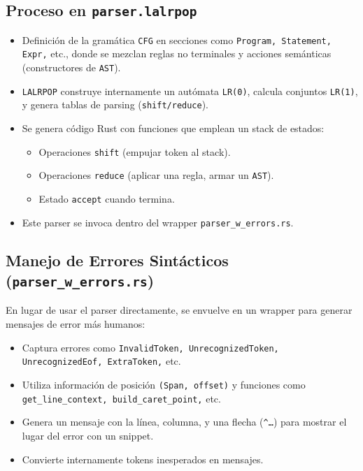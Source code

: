 \documentclass{article}
\begin{document}
\subsection{Proceso en \texttt{parser.lalrpop}}
\begin{itemize}
    \item Definición de la gramática \texttt{CFG} en secciones como \texttt{Program, Statement, Expr,} etc., donde se mezclan reglas no terminales y acciones semánticas (constructores de \texttt{AST}).
    \item \texttt{LALRPOP} construye internamente un autómata \texttt{LR(0)}, calcula conjuntos \texttt{LR(1)}, y genera tablas de parsing (\texttt{shift/reduce}).
    \item Se genera código Rust con funciones que emplean un stack de estados:
        \begin{itemize}
            \item Operaciones \texttt{shift} (empujar token al stack).
            \item Operaciones \texttt{reduce} (aplicar una regla, armar un \texttt{AST}).
            \item Estado \texttt{accept} cuando termina.
        \end{itemize}
    \item Este parser se invoca dentro del wrapper \texttt{parser\_w\_errors.rs}.
\end{itemize}

\subsection{Manejo de Errores Sintácticos (\texttt{parser\_w\_errors.rs})}
En lugar de usar el parser directamente, se envuelve en un wrapper para generar mensajes de error más humanos:
\begin{itemize}
    \item Captura errores como \texttt{InvalidToken, UnrecognizedToken, UnrecognizedEof, ExtraToken,} etc.
    \item Utiliza información de posición \texttt{(Span, offset)} y funciones como \texttt{get\_line\_context, build\_caret\_point,} etc.
    \item Genera un mensaje con la línea, columna, y una flecha (\texttt{\textasciicircum\ldots}) para mostrar el lugar del error con un snippet.
    \item Convierte internamente tokens inesperados en mensajes.
\end{itemize}
\end{document}
